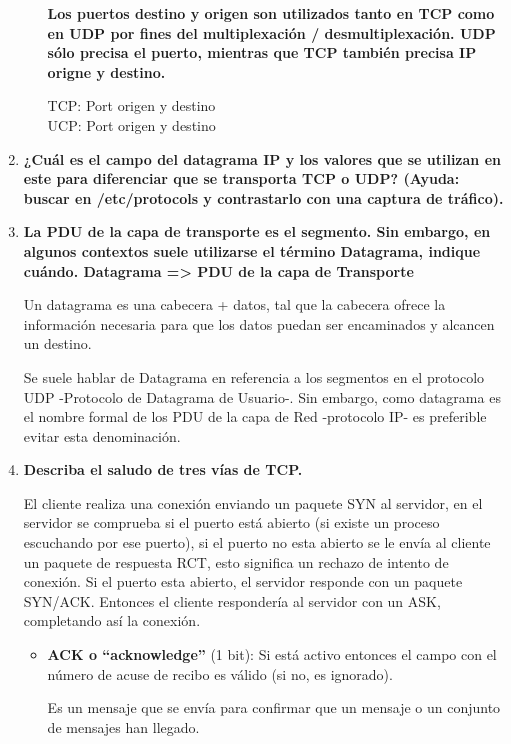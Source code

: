 \documentclass[a4paper,10pt]{article}
\begin{document}
\begin{enumerate}
\begin{enumerate}
            \textbf{Los puertos destino y origen son utilizados tanto en TCP como en UDP por fines del multiplexación / desmultiplexación. UDP sólo precisa el puerto, mientras que TCP también precisa IP origne y destino.}
            
            TCP: Port origen y destino \\
            UCP: Port origen y destino
        \end{enumerate}
        
    \item \textbf{¿Cuál es el campo del datagrama IP y los valores que se utilizan en este para diferenciar que se transporta TCP o UDP? (Ayuda: buscar en /etc/protocols y contrastarlo con una captura de tráfico).}
    
    \item \textbf{La PDU de la capa de transporte es el segmento. Sin embargo, en algunos contextos suele utilizarse el término Datagrama, indique cuándo. Datagrama => PDU de la capa de Transporte}
    
    Un datagrama es una cabecera + datos, tal que la cabecera ofrece la información necesaria para que los datos puedan ser encaminados y alcancen un destino.
    
    Se suele hablar de Datagrama en referencia a los segmentos en el protocolo UDP -Protocolo de Datagrama de Usuario-. Sin embargo, como datagrama es el nombre formal de los PDU de la capa de Red -protocolo IP- es preferible evitar esta denominación.
    
    \item \textbf{Describa el saludo de tres vías de TCP.}
    
    El cliente realiza una conexión enviando un paquete SYN al servidor, en el servidor se comprueba si el puerto está abierto  (si existe un proceso escuchando por ese puerto), si el puerto no  esta abierto se le envía al cliente un paquete de respuesta RCT, esto significa un rechazo de intento de conexión. Si el puerto esta abierto, el servidor responde con un paquete SYN/ACK. Entonces el cliente respondería al servidor con un ASK, completando así la conexión.
    
        \begin{itemize}
            \item \textbf{ACK o “acknowledge”} (1 bit): Si está activo entonces el campo con el número de acuse de recibo es válido (si no, es ignorado).
    
            Es un mensaje que se envía para confirmar que un mensaje o un conjunto de mensajes han llegado.
            

\end{itemize}
\end{enumerate}
\end{document}
